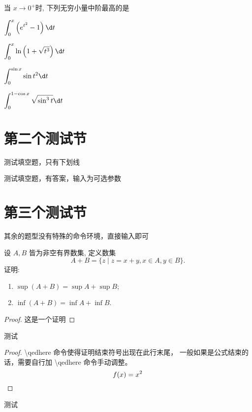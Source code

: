 \begin{exercise}
  当 $x \rightarrow 0^{+}$时, 下列无穷小量中阶最高的是 \paren
  \begin{choices}
    \item $\displaystyle \int_0^x\left(e^{t^2}-1\right) \d t$
    \item $\displaystyle\int_0^x \ln \left(1+\sqrt{t^3}\right) \d t$
    \item $\displaystyle\int_0^{\sin x} \sin t^2 \d t$
    \item $\displaystyle\int_0^{1-\cos x} \sqrt{\sin^3 t} \d t$
  \end{choices}
\end{exercise}



\section{第二个测试节}

\begin{exercise}
  测试填空题，只有下划线 \fillin
\end{exercise}

\begin{exercise}
  测试填空题，有答案，输入为可选参数 \fillin[我是答案]
\end{exercise}



\section{第三个测试节}

\begin{exercise}
  其余的题型没有特殊的命令环境，直接输入即可
\end{exercise}

\begin{exercise}
  设 $A, B$ 皆为非空有界数集, 定义数集
  \[
    A+B=\{z \mid z=x+y, x \in A, y \in B\} .
  \]
  证明:
  \begin{enumerate}[(1)]
    \item $\sup (A+B)=\sup A+\sup B$;
    \item $\inf (A+B)=\inf A+\inf B$.
  \end{enumerate}
\end{exercise}

\begin{proof}
  这是一个证明
\end{proof}

\begin{exercise}
  测试
\end{exercise}

\begin{proof}
  \textbackslash qedhere 命令使得证明结束符号出现在此行末尾，
  一般如果是公式结束的话，需要自行加 \textbackslash qedhere 命令手动调整。
    \[
      f(x) = x^2  \qedhere
    \]
\end{proof}

\begin{exercise}
  测试
\end{exercise}